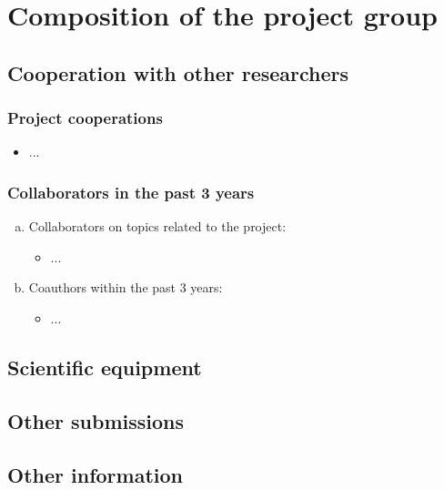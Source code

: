 \documentclass[a4paper,11pt]{article}
\begin{document}
\section{Composition of the project group}
\subsection{Cooperation with other researchers}

\subsubsection{Project cooperations}

\begin{itemize}
  \item ...
\end{itemize}

\subsubsection{Collaborators in the past 3 years}

\begin{enumerate}[(a)]
  \item Collaborators on topics related to the project:
  \begin{itemize}
    \item ...
  \end{itemize}
  \item Coauthors within the past 3 years:
  \begin{itemize}
    \item ...
  \end{itemize}
\end{enumerate}

\subsection{Scientific equipment}

\subsection{Other submissions}

\subsection{Other information}
\end{document}
